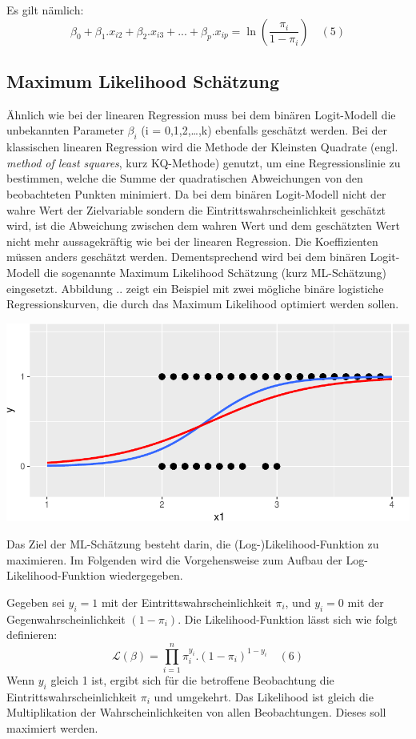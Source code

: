 \documentclass[12pt,]{article}
\begin{document}
Es gilt nämlich: \[
\beta_0 + \beta_1.x_{i2} + \beta_2.x_{i3} + ... + \beta_p.x_{ip} = \ln(\frac{\pi_i}{1-\pi_i}) \quad (5)
\]

\subsection{Maximum Likelihood
Schätzung}\label{maximum-likelihood-schatzung}

Ähnlich wie bei der linearen Regression muss bei dem binären
Logit-Modell die unbekannten Parameter \(\beta_i\) (i =
0,1,2,\ldots{},k) ebenfalls geschätzt werden. Bei der klassischen
linearen Regression wird die Methode der Kleinsten Quadrate (engl.
\emph{method of least squares}, kurz KQ-Methode) genutzt, um eine
Regressionslinie zu bestimmen, welche die Summe der quadratischen
Abweichungen von den beobachteten Punkten minimiert. Da bei dem binären
Logit-Modell nicht der wahre Wert der Zielvariable sondern die
Eintrittswahrscheinlichkeit geschätzt wird, ist die Abweichung zwischen
dem wahren Wert und dem geschätzten Wert nicht mehr aussagekräftig wie
bei der linearen Regression. Die Koeffizienten müssen anders geschätzt
werden. Dementsprechend wird bei dem binären Logit-Modell die sogenannte
Maximum Likelihood Schätzung (kurz ML-Schätzung) eingesetzt. Abbildung
.. zeigt ein Beispiel mit zwei mögliche binäre logistiche
Regressionskurven, die durch das Maximum Likelihood optimiert werden
sollen.

\includegraphics{logisticRegression_files/figure-latex/unnamed-chunk-2-1.pdf}

Das Ziel der ML-Schätzung besteht darin, die (Log-)Likelihood-Funktion
zu maximieren. Im Folgenden wird die Vorgehensweise zum Aufbau der
Log-Likelihood-Funktion wiedergegeben.

Gegeben sei \(y_i = 1\) mit der Eintrittswahrscheinlichkeit \(\pi_i\),
und \(y_i = 0\) mit der Gegenwahrscheinlichkeit \((1-\pi_i)\). Die
Likelihood-Funktion lässt sich wie folgt definieren: \[
\mathcal{L}(\beta) = {\prod_{i=1}^{n} \pi_i^{y_i}.(1-\pi_i)^{1-y_i}} \quad (6)
\] Wenn \(y_i\) gleich 1 ist, ergibt sich für die betroffene Beobachtung
die Eintrittswahrscheinlichkeit \(\pi_i\) und umgekehrt. Das Likelihood
ist gleich die Multiplikation der Wahrscheinlichkeiten von allen
Beobachtungen. Dieses soll maximiert werden.
\end{document}
